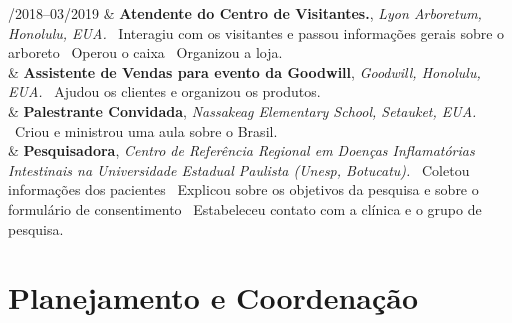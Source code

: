 \documentclass[11pt, a4paper]{article}
\newcommand{\Duration}[2]{\fontsize{10pt}{0}\selectfont #1--#2}
\newcommand{\Year}[1]{\fontsize{10pt}{0}\selectfont #1}
\begin{document}
\begin{EntriesTable}
	\Duration{08/2018}{03/2019}  &
	\textbf{Atendente do Centro de Visitantes.},
	\newline
	\textit{Lyon Arboretum, Honolulu, EUA.}
	\newline
	\textbullet \ Interagiu com os visitantes e passou informações gerais 
	sobre o arboreto
	\textbullet \ Operou o caixa
	\textbullet \ Organizou a loja.
	\\
	\Year{2018}  &
	\textbf{Assistente de Vendas para evento da Goodwill},
	\newline
	\textit{Goodwill, Honolulu, EUA.}
	\newline
	\textbullet \ Ajudou os clientes e organizou os produtos.
		\\
	\Year{2017}  &
	\textbf{Palestrante Convidada},
	\newline
	\textit{Nassakeag Elementary School, Setauket, EUA.}
	\newline
	\textbullet \ Criou e ministrou uma aula sobre o Brasil.
	\\
	\Year{2009}  &
	\textbf{Pesquisadora},
	\newline
	\textit{Centro de Referência Regional em Doenças Inflamatórias 
	Intestinais na Universidade Estadual Paulista (Unesp, Botucatu).}
	\newline
	\textbullet \ Coletou informações dos pacientes
	\textbullet \ Explicou sobre os objetivos da pesquisa e sobre
	o formulário de consentimento
	\textbullet \ Estabeleceu contato com a clínica e o grupo de pesquisa.
	\\

\end{EntriesTable}


\section*{Planejamento e Coordenação}
\end{document}

